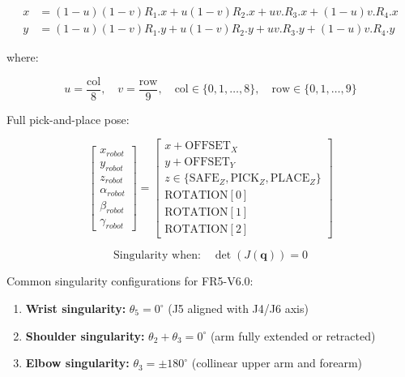 \documentclass[border=10pt, convert={png300}]{standalone}
\begin{document}

\[
\begin{aligned}
x &= (1-u)(1-v)R_1.x + u(1-v)R_2.x + uv.R_3.x + (1-u)v.R_4.x \\
y &= (1-u)(1-v)R_1.y + u(1-v)R_2.y + uv.R_3.y + (1-u)v.R_4.y
\end{aligned}
\]

where:

\[
u = \frac{\text{col}}{8}, \quad v = \frac{\text{row}}{9}, \quad 
\text{col} \in \{0,1,\ldots,8\}, \quad \text{row} \in \{0,1,\ldots,9\}
\]

\bigskip

Full pick-and-place pose:

\[
\begin{bmatrix} x_{robot} \\ y_{robot} \\ z_{robot} \\ \alpha_{robot} \\ \beta_{robot} \\ \gamma_{robot} \end{bmatrix}
=
\begin{bmatrix} 
x + \text{OFFSET}_X \\
y + \text{OFFSET}_Y \\
z \in \{\text{SAFE}_Z, \text{PICK}_Z, \text{PLACE}_Z\} \\
\text{ROTATION}[0] \\
\text{ROTATION}[1] \\
\text{ROTATION}[2]
\end{bmatrix}
\]


\[
\text{Singularity when:} \quad \det(J(\mathbf{q})) = 0
\]

\bigskip

Common singularity configurations for FR5-V6.0:

\begin{enumerate}
    \item \textbf{Wrist singularity:} $\theta_5 = 0^\circ$ (J5 aligned with J4/J6 axis)
    \item \textbf{Shoulder singularity:} $\theta_2 + \theta_3 = 0^\circ$ (arm fully extended or retracted)
    \item \textbf{Elbow singularity:} $\theta_3 = \pm 180^\circ$ (collinear upper arm and forearm)
\end{enumerate}
\end{document}

